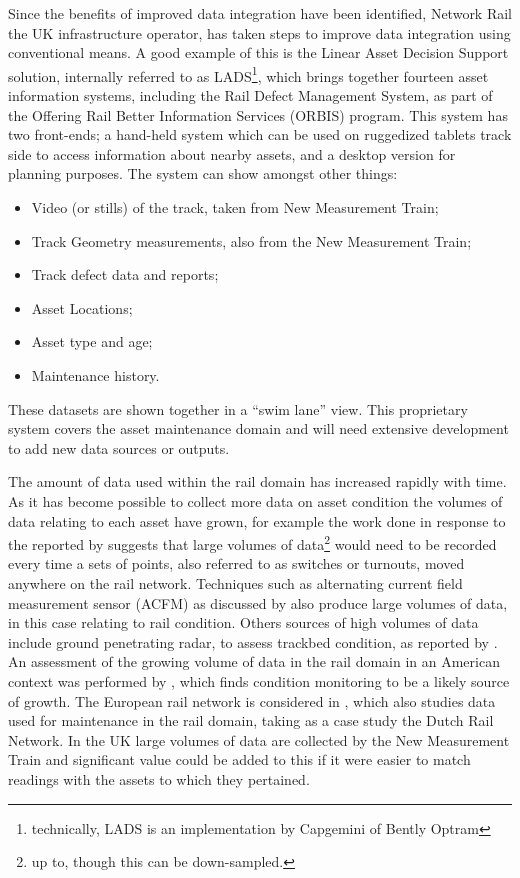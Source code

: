 Since the benefits of improved data integration have been identified, Network Rail the UK infrastructure operator, has taken steps to improve data integration using conventional means. A good example of this is the Linear Asset Decision Support solution, internally referred to as LADS\footnote{technically, LADS is an implementation by Capgemini of Bently Optram}, which brings together fourteen asset information systems, including the Rail Defect Management System, as part of the Offering Rail Better Information Services (ORBIS) program. This system has two front-ends; a hand-held system which can be used on ruggedized tablets track side to access information about nearby assets, and a desktop version for planning purposes. The system can show amongst other things:
\begin{itemize}
    \item Video (or stills) of the track, taken from New Measurement Train;
    \item Track Geometry measurements, also from the New Measurement Train;
    \item Track defect data and reports;
    \item Asset Locations;
    \item Asset type and age;
    \item Maintenance history.  
\end{itemize} 
These datasets are shown together in a ``swim lane'' view. This proprietary system covers the asset maintenance domain and will need extensive development to add new data sources or outputs. 
 
The amount of data used within the rail domain has increased rapidly with time. As it has become possible to collect more data on asset condition the volumes of data relating to each asset have grown, for example the work done in response to the  reported by \citet{Tutcher2015a} suggests that large volumes of data\footnote{up to, though this can be down-sampled.} would need to be recorded every time a sets of points, also referred to as switches or turnouts, moved anywhere on the rail network. Techniques such as alternating current field measurement sensor (ACFM) as discussed by \citet{Rowshandel2013} also produce large volumes of data, in this case relating to rail condition. Others sources of high volumes of data include ground penetrating radar, to assess trackbed condition, as reported by \citet{eriksen2004improved}. An assessment of the growing volume of data in the rail domain in an American context was performed by \citet{Zarembski}, which finds condition monitoring to be a likely source of growth. The European rail network is considered in \citet{Nunez2014}, which also studies data used for maintenance in the rail domain, taking as a case study the Dutch Rail Network. In the UK large volumes of  data are collected by the New Measurement Train and significant value could be added to this if it were easier to match readings with the assets to which they pertained.

